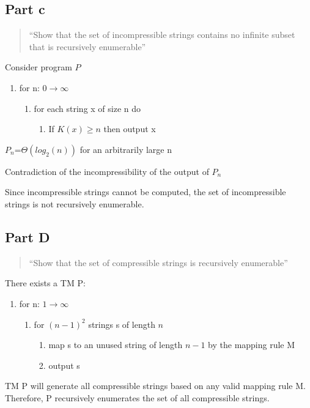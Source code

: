 \documentclass{article}
\begin{document}
\subsection{Part c}
\begin{quote}
``Show that the set of incompressible strings contains no infinite subset that is recursively enumerable''
\end{quote}

Consider program $P$
\begin{enumerate}[label=]
\item for n: $0\rightarrow\infty$
\begin{enumerate}[label=]
\item for each string x of size n do
\begin{enumerate}[label=]
\item If $K(x)\geq n$ then output x
\end{enumerate}
\end{enumerate}
\end{enumerate}

$P_{n}$=$\Theta (log_{2}(n))$ for an arbitrarily large n

Contradiction of the incompressibility of the output of $P_{n}$

Since incompressible strings cannot be computed, the set of incompressible strings is not recursively enumerable.

\subsection{Part D}
\begin{quote}
``Show that the set of compressible strings is recursively enumerable''
\end{quote}

There exists a TM P:
\begin{enumerate}[label=]
\item for n: $1\rightarrow\infty$
\begin{enumerate}[label=]
\item for $(n-1)^2$ strings s of length $n$
\begin{enumerate}[label=]
\item map s to an unused string of length $n-1$ by the mapping rule M
\item output s
\end{enumerate}
\end{enumerate}
\end{enumerate}

TM P will generate all compressible strings based on any valid mapping rule M.  Therefore, P recursively enumerates the set of all compressible strings.
\end{document}
